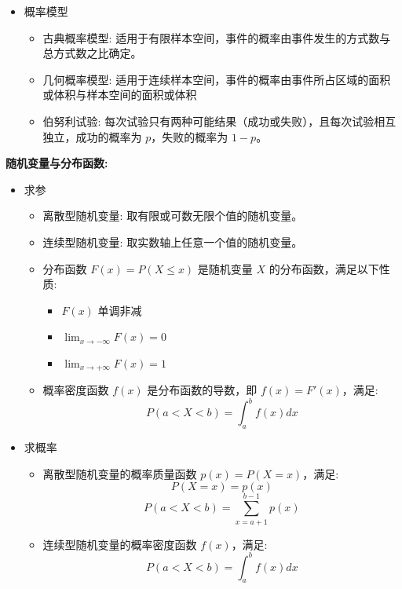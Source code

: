 \documentclass[10pt]{article}
\begin{document}
\begin{multicols}{2}
\begin{itemize}
  \item 概率模型
    \begin{itemize}
      \item 古典概率模型: 适用于有限样本空间，事件的概率由事件发生的方式数与总方式数之比确定。
      \item 几何概率模型: 适用于连续样本空间，事件的概率由事件所占区域的面积或体积与样本空间的面积或体积
      \item 伯努利试验: 每次试验只有两种可能结果（成功或失败），且每次试验相互独立，成功的概率为 \(p\)，失败的概率为 \(1-p\)。
    \end{itemize}
\end{itemize}

\textbf{随机变量与分布函数:}

\begin{itemize}
  \item 求参
    \begin{itemize}
      \item 离散型随机变量: 取有限或可数无限个值的随机变量。
      \item 连续型随机变量: 取实数轴上任意一个值的随机变量。
      \item 分布函数 \(F(x) = P(X \leq x)\) 是随机变量 \(X\) 的分布函数，满足以下性质:
        \begin{itemize}
          \item \(F(x)\) 单调非减
          \item \(\lim_{x \to -\infty} F(x) = 0\)
          \item \(\lim_{x \to +\infty} F(x) = 1\)
        \end{itemize}
      \item 概率密度函数 \(f(x)\) 是分布函数的导数，即 \(f(x) = F'(x)\)，满足:
        \[
        P(a < X < b) = \int_a^b f(x) dx
        \]
      \end{itemize}
  \item 求概率
    \begin{itemize}
      \item 离散型随机变量的概率质量函数 \(p(x) = P(X = x)\)，满足:
        \[
        P(X = x) = p(x)
        \]
        \[
        P(a < X < b) = \sum_{x=a+1}^{b-1} p(x)
        \]
      \item 连续型随机变量的概率密度函数 \(f(x)\)，满足:
        \[
        P(a < X < b) = \int_a^b f(x) dx
        \]
    \end{itemize}
\end{itemize}


\end{multicols}
\end{document}
